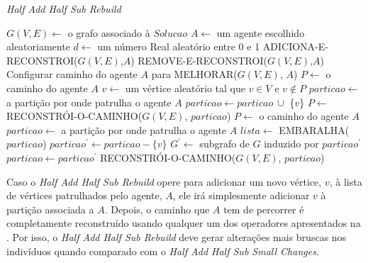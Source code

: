 \begin{algorithm}                   %
	\caption{\textit{Half Add Half Sub Rebuild}}          %
	\label{rebuild}                           %
	\begin{algorithmic}[1]                   %
		\newline
		\State $G(V,E) \gets $ o grafo associado à $Solucao$
		\State $A \gets $ um agente escolhido aleatoriamente
		\State $d \gets $ um número Real aleatório entre 0 e 1
			\State ADICIONA-E-RECONSTROI($G(V,E)$,$A$)
		\Else
			\State REMOVE-E-RECONSTROI($G(V,E)$,$A$)
		\EndIf
		\State Configurar caminho do agente $A$ para MELHORAR($G(V,E)$, $A$)
		\EndProcedure
		\State $P \gets $ o caminho do agente $A$
		\State $v \gets $ um vértice aleatório tal que $v \in V$ e $v \notin P$
		\State $particao \gets $ a partição por onde patrulha o agente $A$
		\State $particao \gets particao\ \cup $ \{$v$\}
		\State $P \gets $ RECONSTRÓI-O-CAMINHO($G(V,E)$, $particao$)
		\EndProcedure
		\State $P \gets $ o caminho do agente $A$
		\State $particao \gets $ a partição por onde patrulha o agente $A$
		\State $lista \gets $ EMBARALHA($particao$) 
			\State $particao^{\prime} \gets particao - \{v\}$
			\State $G^{\prime} \gets $ subgrafo de $G$ induzido por $particao^{\prime}$
		\EndFor
		\State $particao \gets particao^{\prime}$
		\State RECONSTRÓI-O-CAMINHO($G(V,E)$, $particao$)
		\EndProcedure
	\end{algorithmic}
\end{algorithm}

Caso o \textit{Half Add Half Sub Rebuild} opere para adicionar um novo vértice, 
$v$, à lista de vértices patrulhados pelo agente, $A$, ele irá simplesmente 
adicionar $v$ à partição associada a $A$. Depois, o caminho que $A$ tem de 
percorrer é completamente reconstruído usando qualquer um dos operadores 
apresentados na . Por isso, o 
\textit{Half Add Half Sub Rebuild} deve gerar alterações mais bruscas nos 
indivíduos quando comparado com o \textit{Half Add Half Sub Small Changes}.

